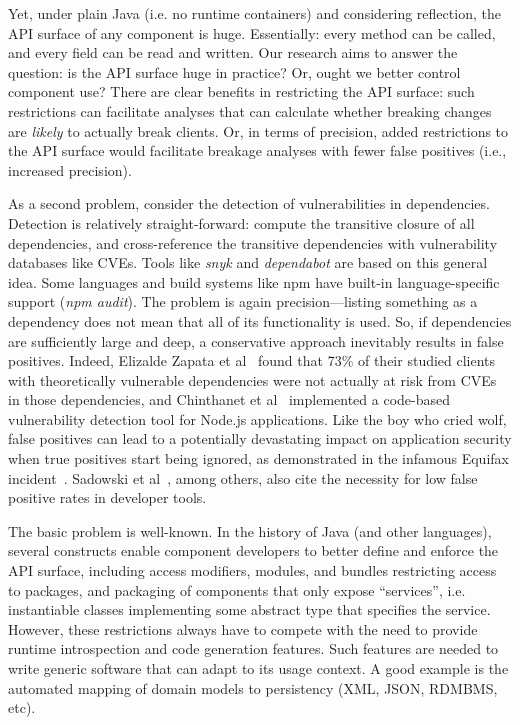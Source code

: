 Yet, under plain Java (i.e. no runtime containers) and considering reflection, the API surface of any component is huge. Essentially: every method can be called, and every field can be read and written. Our research aims to answer the question: is the API surface huge in practice? Or, ought we better control component use? There are clear benefits in restricting the API surface: such restrictions can facilitate analyses that can calculate whether breaking changes are \textit{likely} to actually break clients.  Or, in terms of precision, added restrictions to the API surface would facilitate breakage analyses with fewer false positives (i.e., increased precision). 

As a second problem, consider the detection of vulnerabilities in dependencies. Detection is relatively straight-forward: compute the transitive closure of all dependencies, and cross-reference the transitive dependencies with vulnerability databases like CVEs. Tools like \textit{snyk} and \textit{dependabot} are based on this general idea. Some languages and build systems like npm have built-in language-specific support (\textit{npm audit}). The problem is again precision---listing something as a dependency does not mean that all of its functionality is used. So, if dependencies are sufficiently large and deep, a conservative approach inevitably results in false positives. Indeed, Elizalde Zapata et al~\cite{elizalde18:_towar_smoot_librar_migrat} found that 73\% of their studied clients with theoretically vulnerable dependencies were not actually at risk from CVEs in those dependencies, and Chinthanet et al~\cite{chinthanet20:_code_based_vulner_detec_node} implemented a code-based vulnerability detection tool for Node.js applications. Like the boy who cried wolf, false positives can lead to a potentially devastating impact on application security when true positives start being ignored, as demonstrated in the infamous Equifax incident~\cite{luszcz2018apache}. Sadowski et al~\cite{sadowski2018lessons}, among others, also cite the necessity for low false positive rates in developer tools.

The basic problem is well-known. In the history of Java (and other languages), several constructs enable component developers to better define and enforce the API surface, including access modifiers, modules, and bundles restricting access to packages, and packaging of components that only expose ``services'', i.e. instantiable classes implementing some abstract type that specifies the service. However, these restrictions always have to compete with the need to provide runtime introspection and code generation features.  Such features are needed to write generic software that can adapt to its usage context. A good example is the automated mapping of domain models to persistency (XML, JSON, RDMBMS, etc).

